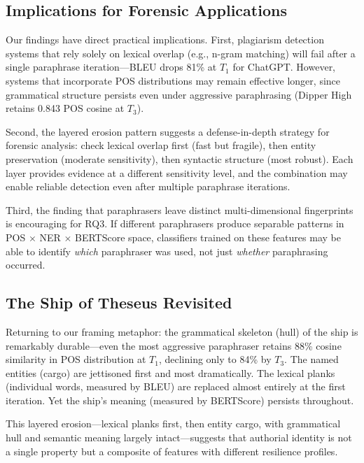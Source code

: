 \subsection{Implications for Forensic Applications}

Our findings have direct practical implications. First, plagiarism detection systems that rely solely on lexical overlap (e.g., n-gram matching) will fail after a single paraphrase iteration---BLEU drops 81\% at $T_1$ for ChatGPT. However, systems that incorporate POS distributions may remain effective longer, since grammatical structure persists even under aggressive paraphrasing (Dipper High retains 0.843 POS cosine at $T_3$).

Second, the layered erosion pattern suggests a defense-in-depth strategy for forensic analysis: check lexical overlap first (fast but fragile), then entity preservation (moderate sensitivity), then syntactic structure (most robust). Each layer provides evidence at a different sensitivity level, and the combination may enable reliable detection even after multiple paraphrase iterations.

Third, the finding that paraphrasers leave distinct multi-dimensional fingerprints is encouraging for RQ3. If different paraphrasers produce separable patterns in POS $\times$ NER $\times$ BERTScore space, classifiers trained on these features may be able to identify \emph{which} paraphraser was used, not just \emph{whether} paraphrasing occurred.

\subsection{The Ship of Theseus Revisited}

Returning to our framing metaphor: the grammatical skeleton (hull) of the ship is remarkably durable---even the most aggressive paraphraser retains 88\% cosine similarity in POS distribution at $T_1$, declining only to 84\% by $T_3$. The named entities (cargo) are jettisoned first and most dramatically. The lexical planks (individual words, measured by BLEU) are replaced almost entirely at the first iteration. Yet the ship's meaning (measured by BERTScore) persists throughout.

This layered erosion---lexical planks first, then entity cargo, with grammatical hull and semantic meaning largely intact---suggests that authorial identity is not a single property but a composite of features with different resilience profiles.

